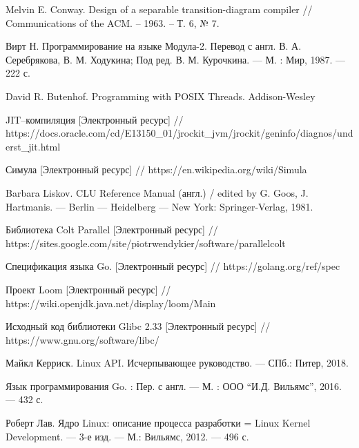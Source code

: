 \begingroup 
\renewcommand{\section}[2]{\anonsection{Библиографический список}}
\begin{flushleft}
\begin{thebibliography}{}

	
    Melvin E. Conway. Design of a separable transition-diagram compiler // 
    Communications of the ACM. -- 1963. -- Т. 6, № 7.

	Вирт Н. Программирование на языке Модула-2. Перевод с англ. В. А. Серебрякова, В. М. Ходукина; Под ред. В. М. Курочкина. — М. : Мир, 1987. — 222 с.
	
	David R. Butenhof. Programming with POSIX Threads. Addison-Wesley
	
	JIT--компиляция 
	[Электронный ресурс] //
	https://docs.oracle.com/cd/E13150\_01/jrockit\_jvm/jrockit/geninfo/diagnos/underst\_jit.html
	
	Симула
	[Электронный ресурс] //
	https://en.wikipedia.org/wiki/Simula
	
	Barbara Liskov. CLU Reference Manual (англ.) / edited by G. Goos, J. Hartmanis. — Berlin — Heidelberg — New York: Springer-Verlag, 1981.
	
	Библиотека Colt Parallel
	[Электронный ресурс] //
	https://sites.google.com/site/piotrwendykier/software/parallelcolt
	
	Спецификация языка Go.
	[Электронный ресурс] //
	https://golang.org/ref/spec
	
	Проект Loom
	[Электронный ресурс] //
	https://wiki.openjdk.java.net/display/loom/Main
	
	Исходный код библиотеки Glibc 2.33
	[Электронный ресурс] //
	https://www.gnu.org/software/libc/ %

	Майкл Керриск. Linux API. Исчерпывающее руководство. — СПб.: Питер, 2018.

	Язык  программирования  Go. : Пер. с англ. — М. : ООО “И.Д.  Вильямс”, 2016. — 432 с. 

	Роберт Лав. Ядро Linux: описание процесса разработки = Linux Kernel Development. — 
	3-е изд. — М.: Вильямс, 2012. — 496 с.
	

\end{thebibliography}
\end{flushleft}
